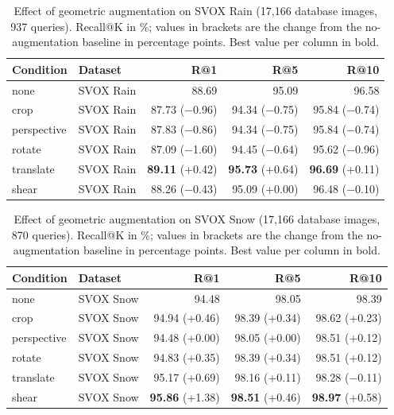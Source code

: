 \begin{table}[htbp]
\centering
\caption{Effect of geometric augmentation on SVOX Rain (17,166 database images, 937 queries). Recall@K in \%; values in brackets are the change from the no-augmentation baseline in percentage points. Best value per column in bold.}
\label{tab:geoaug_svox_rain}
\begin{tabular}{llrrr}
\toprule
Condition & Dataset & R@1 & R@5 & R@10 \\
\midrule
none & SVOX Rain & 88.69 & 95.09 & 96.58 \\
\midrule
crop & SVOX Rain & 87.73 {\scriptsize ($-$0.96)} & 94.34 {\scriptsize ($-$0.75)} & 95.84 {\scriptsize ($-$0.74)} \\
perspective & SVOX Rain & 87.83 {\scriptsize ($-$0.86)} & 94.34 {\scriptsize ($-$0.75)} & 95.84 {\scriptsize ($-$0.74)} \\
rotate & SVOX Rain & 87.09 {\scriptsize ($-$1.60)} & 94.45 {\scriptsize ($-$0.64)} & 95.62 {\scriptsize ($-$0.96)} \\
translate & SVOX Rain & \textbf{89.11} {\scriptsize (+0.42)} & \textbf{95.73} {\scriptsize (+0.64)} & \textbf{96.69} {\scriptsize (+0.11)} \\
shear & SVOX Rain & 88.26 {\scriptsize ($-$0.43)} & 95.09 {\scriptsize (+0.00)} & 96.48 {\scriptsize ($-$0.10)} \\
\bottomrule
\end{tabular}
\end{table}

\begin{table}[htbp]
\centering
\caption{Effect of geometric augmentation on SVOX Snow (17,166 database images, 870 queries). Recall@K in \%; values in brackets are the change from the no-augmentation baseline in percentage points. Best value per column in bold.}
\label{tab:geoaug_svox_snow}
\begin{tabular}{llrrr}
\toprule
Condition & Dataset & R@1 & R@5 & R@10 \\
\midrule
none & SVOX Snow & 94.48 & 98.05 & 98.39 \\
\midrule
crop & SVOX Snow & 94.94 {\scriptsize (+0.46)} & 98.39 {\scriptsize (+0.34)} & 98.62 {\scriptsize (+0.23)} \\
perspective & SVOX Snow & 94.48 {\scriptsize (+0.00)} & 98.05 {\scriptsize (+0.00)} & 98.51 {\scriptsize (+0.12)} \\
rotate & SVOX Snow & 94.83 {\scriptsize (+0.35)} & 98.39 {\scriptsize (+0.34)} & 98.51 {\scriptsize (+0.12)} \\
translate & SVOX Snow & 95.17 {\scriptsize (+0.69)} & 98.16 {\scriptsize (+0.11)} & 98.28 {\scriptsize ($-$0.11)} \\
shear & SVOX Snow & \textbf{95.86} {\scriptsize (+1.38)} & \textbf{98.51} {\scriptsize (+0.46)} & \textbf{98.97} {\scriptsize (+0.58)} \\
\bottomrule
\end{tabular}
\end{table}

